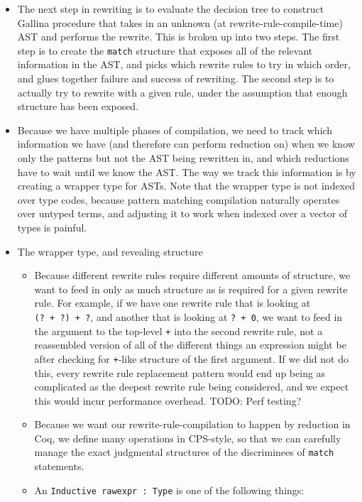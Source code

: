\begin{itemize}
\tightlist
\item
  The next step in rewriting is to evaluate the decision tree to
  construct Gallina procedure that takes in an unknown (at
  rewrite-rule-compile-time) AST and performs the rewrite. This is
  broken up into two steps. The first step is to create the
  \texttt{match} structure that exposes all of the relevant information
  in the AST, and picks which rewrite rules to try in which order, and
  glues together failure and success of rewriting. The second step is to
  actually try to rewrite with a given rule, under the assumption that
  enough structure has been exposed.
\item
  Because we have multiple phases of compilation, we need to track which
  information we have (and therefore can perform reduction on) when we
  know only the patterns but not the AST being rewritten in, and which
  reductions have to wait until we know the AST. The way we track this
  information is by creating a wrapper type for ASTs. Note that the
  wrapper type is not indexed over type codes, because pattern matching
  compilation naturally operates over untyped terms, and adjusting it to
  work when indexed over a vector of types is painful.
\item
  The wrapper type, and revealing structure

  \begin{itemize}
  \item
    Because different rewrite rules require different amounts of
    structure, we want to feed in only as much structure as is required
    for a given rewrite rule. For example, if we have one rewrite rule
    that is looking at \texttt{(?\ +\ ?)\ +\ ?}, and another that is
    looking at \texttt{?\ +\ 0}, we want to feed in the argument to the
    top-level \texttt{+} into the second rewrite rule, not a reassembled
    version of all of the different things an expression might be after
    checking for \texttt{+}-like structure of the first argument. If we
    did not do this, every rewrite rule replacement pattern would end up
    being as complicated as the deepest rewrite rule being considered,
    and we expect this would incur performance overhead. TODO: Perf
    testing?
  \item
    Because we want our rewrite-rule-compilation to happen by reduction
    in Coq, we define many operations in CPS-style, so that we can
    carefully manage the exact judgmental structures of the discriminees
    of \texttt{match} statements.
  \item
    An \texttt{Inductive\ rawexpr\ :\ Type} is one of the following
    things:


\end{itemize}
\end{itemize}

